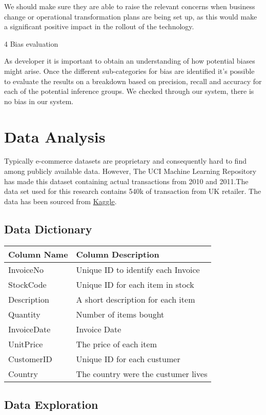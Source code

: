 We should make sure they are able to raise the relevant concerns when
business change or operational transformation plans are being set up, as
this would make a significant positive impact in the rollout of the
technology.

4 Bias evaluation

As developer it is important to obtain an understanding of how potential
biases might arise. Once the different sub-categories for bias are
identified it's possible to evaluate the results on a breakdown based on
precision, recall and accuracy for each of the potential inference
groups. We checked through our system, there is no bias in our system.

\hypertarget{data-analysis}{%
\section{Data Analysis}\label{data-analysis}}

Typically e-commerce datasets are proprietary and consequently hard to
find among publicly available data. However, The UCI Machine Learning
Repository has made this dataset containing actual transactions from
2010 and 2011.The data set used for this research contains 540k of
transaction from UK retailer. The data has been sourced from
\href{https://www.kaggle.com/carrie1/ecommerce-data}{Kaggle}.

\hypertarget{data-dictionary}{%
\subsection{Data Dictionary}\label{data-dictionary}}

\begin{longtable}[]{@{}ll@{}}
\toprule
Column Name & Column Description\tabularnewline
\midrule
\endhead
InvoiceNo & Unique ID to identify each Invoice\tabularnewline
StockCode & Unique ID for each item in stock\tabularnewline
Description & A short description for each item\tabularnewline
Quantity & Number of items bought\tabularnewline
InvoiceDate & Invoice Date\tabularnewline
UnitPrice & The price of each item\tabularnewline
CustomerID & Unique ID for each custumer\tabularnewline
Country & The country were the custumer lives\tabularnewline
\bottomrule
\end{longtable}

\hypertarget{data-exploration}{%
\subsection{Data Exploration}\label{data-exploration}}

